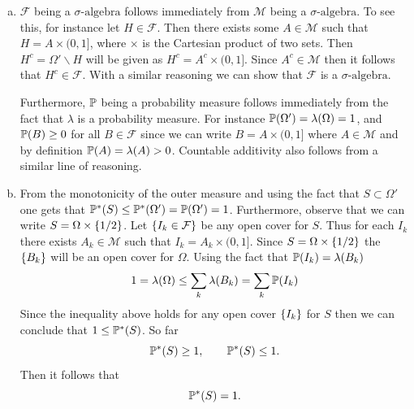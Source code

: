 \begin{solution}
	\begin{enumerate}[(a)]
		\item $ \mathcal{F} $ being a $\sigma\text{-algebra}$ follows immediately from $ \mathcal{M} $ being a $\sigma\text{-algebra}$. To see this, for instance let $ H \in \mathcal{F} $. Then there exists some $ A \in \mathcal{M} $ such that $ H = A \times (0,1] $, where $ \times $ is the Cartesian product of two sets. Then $ H^c = \Omega'\backslash H $ will be given as $ H^c = A^c \times(0,1] $. Since $ A^c \in \mathcal{M} $ then it follows that $ H^c \in \mathcal{F} $. With a similar reasoning we can show that $ \mathcal{F} $ is a $\sigma\text{-algebra}$.
		
		\noindent Furthermore, $ \mathbb{P} $ being a probability measure follows immediately from the fact that $ \lambda $ is a probability measure. For instance $ \mathbb{P}(\Omega') = \lambda(\Omega) = 1 $, and $ \mathbb{P}(B) \geq 0 $ for all $ B \in \mathcal{F} $ since we can write $ B = A \times(0,1] $ where $ A \in \mathcal{M} $ and by definition $ \mathbb{P}(A) = \lambda(A) > 0 $. Countable additivity also follows from a similar line of reasoning.
		
		\item From the monotonicity of the outer measure and using the fact that $ S \subset \Omega' $ one gets that $ \mathbb{P}^*(S) \leq \mathbb{P}^*(\Omega') = \mathbb{P}(\Omega') = 1 $. Furthermore, observe that we can write $ S = \Omega \times\{1/2\} $. Let $ \{I_k \in \mathcal{F}\} $ be any open cover for $ S $. Thus for each $ I_k $ there exists $ A_k \in\mathcal{M} $ such that $ I_k = A_k \times(0,1] $. Since $ S = \Omega\times\{1/2\} $ the  $ \{B_k\} $ will be an open cover for $ \Omega $. Using the fact that $ \mathbb{P}(I_k) = \lambda(B_k) $
		\[ 1 = \lambda(\Omega)  \leq \sum_k \lambda(B_k) = \sum_k \mathbb{P}(I_k)  \]
		Since the inequality above holds for any open cover $ \{I_k\} $ for $ S $ then we can conclude that $ 1 \leq \mathbb{P}^*(S) $. So far
		\[ \mathbb{P}^*(S) \geq 1, \qquad \mathbb{P}^*(S)\leq 1. \]
		Then it follows that 
		\[ \mathbb{P}^*(S) = 1. \]
	\end{enumerate}
\end{solution}

